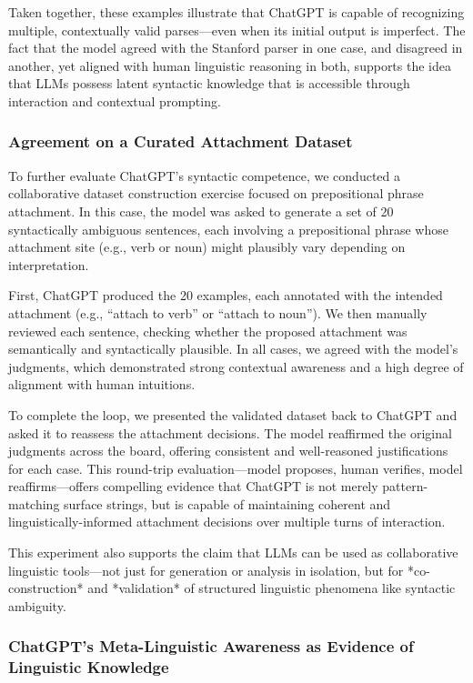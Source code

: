 Taken together, these examples illustrate that ChatGPT is capable of recognizing multiple, contextually valid parses—even when its initial output is imperfect. The fact that the model agreed with the Stanford parser in one case, and disagreed in another, yet aligned with human linguistic reasoning in both, supports the idea that LLMs possess latent syntactic knowledge that is accessible through interaction and contextual prompting.

\subsubsection{Agreement on a Curated Attachment Dataset}

To further evaluate ChatGPT’s syntactic competence, we conducted a collaborative dataset construction exercise focused on prepositional phrase attachment. In this case, the model was asked to generate a set of 20 syntactically ambiguous sentences, each involving a prepositional phrase whose attachment site (e.g., verb or noun) might plausibly vary depending on interpretation.

First, ChatGPT produced the 20 examples, each annotated with the intended attachment (e.g., “attach to verb” or “attach to noun”). We then manually reviewed each sentence, checking whether the proposed attachment was semantically and syntactically plausible. In all cases, we agreed with the model’s judgments, which demonstrated strong contextual awareness and a high degree of alignment with human intuitions.

To complete the loop, we presented the validated dataset back to ChatGPT and asked it to reassess the attachment decisions. The model reaffirmed the original judgments across the board, offering consistent and well-reasoned justifications for each case. This round-trip evaluation—model proposes, human verifies, model reaffirms—offers compelling evidence that ChatGPT is not merely pattern-matching surface strings, but is capable of maintaining coherent and linguistically-informed attachment decisions over multiple turns of interaction.

This experiment also supports the claim that LLMs can be used as collaborative linguistic tools—not just for generation or analysis in isolation, but for *co-construction* and *validation* of structured linguistic phenomena like syntactic ambiguity.

\subsubsection{ChatGPT's Meta-Linguistic Awareness as Evidence of Linguistic Knowledge}

